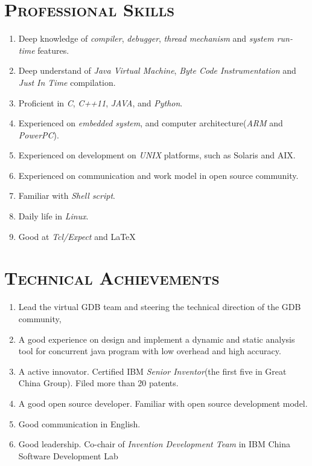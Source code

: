 \begin{resume}
\section{\textsc{Professional Skills}}
\begin{enumerate} 
\item[] Deep knowledge of \emph{compiler}, \emph{debugger}, \emph{thread mechanism} and \emph{system run-time} features.
\item[] Deep understand of \emph{Java Virtual Machine}, \emph{Byte Code Instrumentation} and \emph{Just In Time} compilation.
\item[] Proficient in \emph{C}, \emph{C++11}, \emph{JAVA}, and \emph{Python}.
\item[] Experienced on \emph{embedded system}, and computer architecture(\emph{ARM} and \emph{PowerPC}).
\item[] Experienced on development on \emph{UNIX} platforms, such as Solaris and AIX.
\item[] Experienced on communication and work model in open source community.
\item[] Familiar with \emph{Shell script}.
\item[] Daily life in \emph{Linux}.
\item[] Good at \emph{Tcl/Expect} and 
 \LaTeX
\end{enumerate}

\section{\textsc{Technical Achievements}}
\begin{enumerate}
  \item[] Lead the virtual GDB team and steering the technical direction of the GDB community,
\item[] A good experience on design and implement a dynamic and static analysis tool for concurrent java program with low overhead and high accuracy.
\item[] A active innovator.  Certified IBM \emph{Senior Inventor}(the first five in Great China Group).  Filed more than 20 patents.
\item[] A good open source developer.  Familiar with open source development model.
\item[] Good communication in English.
\item[] Good leadership.  Co-chair of \emph{Invention Development Team} in IBM China Software Development Lab
\end{enumerate}


\end{resume}

